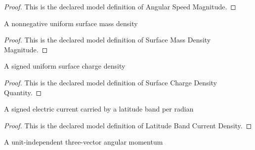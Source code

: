 \begin{proof}
  This is the declared model definition of Angular Speed Magnitude.
\end{proof}
\begin{definition}
  \label{def:physics:phyx-mini-0970:phyxminiproblems-problemphyxmini0970-surfacemassdensitymagnitude}
  A nonnegative uniform surface mass density
\end{definition}
\begin{proof}
  This is the declared model definition of Surface Mass Density Magnitude.
\end{proof}
\begin{definition}
  \label{def:physics:phyx-mini-0970:phyxminiproblems-problemphyxmini0970-surfacechargedensityquantity}
  A signed uniform surface charge density
\end{definition}
\begin{proof}
  This is the declared model definition of Surface Charge Density Quantity.
\end{proof}
\begin{definition}
  \label{def:physics:phyx-mini-0970:phyxminiproblems-problemphyxmini0970-latitudebandcurrentdensity}
  A signed electric current carried by a latitude band per radian
\end{definition}
\begin{proof}
  This is the declared model definition of Latitude Band Current Density.
\end{proof}
\begin{definition}
  \label{def:physics:phyx-mini-0970:phyxminiproblems-problemphyxmini0970-angularmomentumvector}
  A unit-independent three-vector angular momentum
\end{definition}
